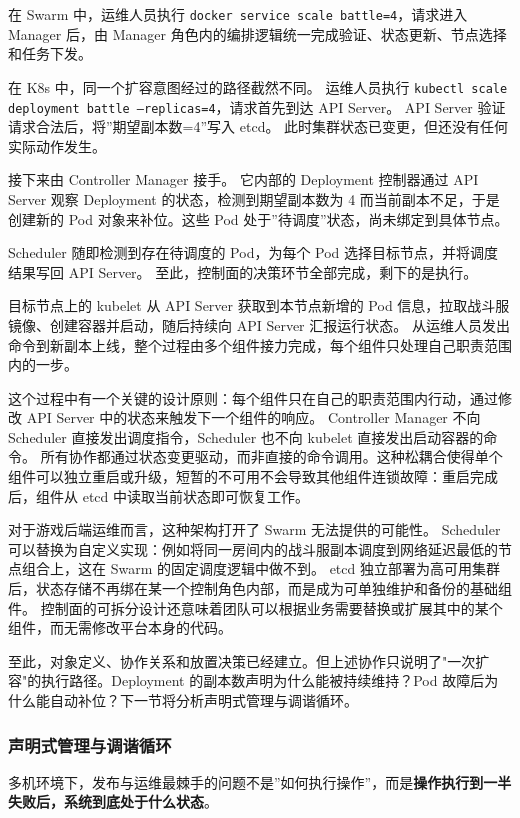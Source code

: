 在 Swarm 中，运维人员执行 \texttt{docker service scale battle=4}，请求进入 Manager 后，由 Manager 角色内的编排逻辑统一完成验证、状态更新、节点选择和任务下发。

在 K8s 中，同一个扩容意图经过的路径截然不同。
运维人员执行 \texttt{kubectl scale deployment battle --replicas=4}，请求首先到达 API Server。
API Server 验证请求合法后，将”期望副本数=4”写入 etcd。
此时集群状态已变更，但还没有任何实际动作发生。

接下来由 Controller Manager 接手。
它内部的 Deployment 控制器通过 API Server 观察 Deployment 的状态，检测到期望副本数为 4 而当前副本不足，于是创建新的 Pod 对象来补位。这些 Pod 处于”待调度”状态，尚未绑定到具体节点。

Scheduler 随即检测到存在待调度的 Pod，为每个 Pod 选择目标节点，并将调度结果写回 API Server。
至此，控制面的决策环节全部完成，剩下的是执行。

目标节点上的 kubelet 从 API Server 获取到本节点新增的 Pod 信息，拉取战斗服镜像、创建容器并启动，随后持续向 API Server 汇报运行状态。
从运维人员发出命令到新副本上线，整个过程由多个组件接力完成，每个组件只处理自己职责范围内的一步。

这个过程中有一个关键的设计原则：每个组件只在自己的职责范围内行动，通过修改 API Server 中的状态来触发下一个组件的响应。
Controller Manager 不向 Scheduler 直接发出调度指令，Scheduler 也不向 kubelet 直接发出启动容器的命令。
所有协作都通过状态变更驱动，而非直接的命令调用。这种松耦合使得单个组件可以独立重启或升级，短暂的不可用不会导致其他组件连锁故障：重启完成后，组件从 etcd 中读取当前状态即可恢复工作。

对于游戏后端运维而言，这种架构打开了 Swarm 无法提供的可能性。
Scheduler 可以替换为自定义实现：例如将同一房间内的战斗服副本调度到网络延迟最低的节点组合上，这在 Swarm 的固定调度逻辑中做不到。
etcd 独立部署为高可用集群后，状态存储不再绑在某一个控制角色内部，而是成为可单独维护和备份的基础组件。
控制面的可拆分设计还意味着团队可以根据业务需要替换或扩展其中的某个组件，而无需修改平台本身的代码。

至此，对象定义、协作关系和放置决策已经建立。但上述协作只说明了"一次扩容"的执行路径。Deployment 的副本数声明为什么能被持续维持？Pod 故障后为什么能自动补位？下一节将分析声明式管理与调谐循环。

\subsubsection{声明式管理与调谐循环}

多机环境下，发布与运维最棘手的问题不是”如何执行操作”，而是\textbf{操作执行到一半失败后，系统到底处于什么状态}。

